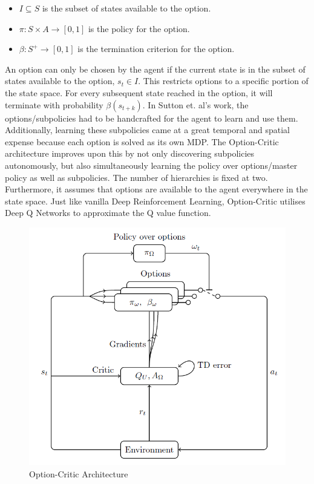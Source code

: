 \documentclass[notitlepage,a4paper,11pt]{article}
\begin{document}
\begin{itemize}[noitemsep]
	\itemsep0em
	\item $I \subseteq S$ is the subset of states available to the option.
	\item $\pi : S \times A \to [0,1]$ is the policy for the option.
	\item $\beta : S^+ \to [0,1]$ is the termination criterion for the option.
\end{itemize}

An option can only be chosen by the agent if the current state is in the subset of states available to the option, $s_t \in I$. This restricts options to a specific portion of the state space. For every subsequent state reached in the option, it will terminate with probability $\beta(s_{t+k})$. In Sutton et. al's work, the options/subpolicies had to be handcrafted for the agent to learn and use them. Additionally, learning these subpolicies came at a great temporal and spatial expense because each option is solved as its own MDP. The Option-Critic architecture \cite{bacon2017option} improves upon this by not only discovering subpolicies autonomously, but also simultaneously learning the policy over options/master policy as well as subpolicies. The number of hierarchies is fixed at two. Furthermore, it assumes that options are available to the agent everywhere in the state space. Just like vanilla Deep Reinforcement Learning, Option-Critic utilises Deep Q Networks to approximate the Q value function.

\begin{figure}[!htb]
\centering
\includegraphics[width=.5\linewidth]{figs/option_critic_architecture.png}
\caption{Option-Critic Architecture \protect\cite{ribas2011neural}} \label{fig:4}
\end{figure}
\end{document}
